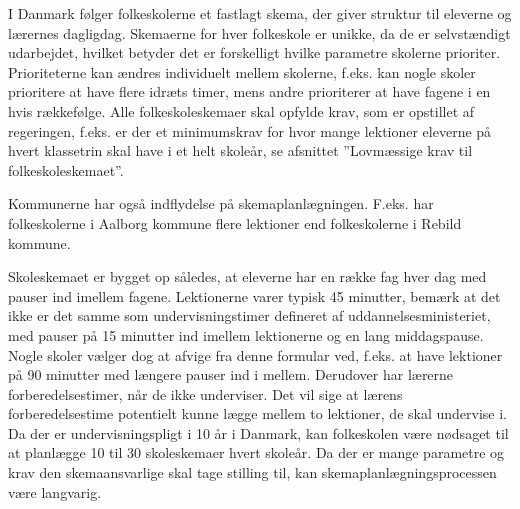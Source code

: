 I Danmark følger folkeskolerne et fastlagt skema, der giver struktur til eleverne og lærernes dagligdag. Skemaerne for hver folkeskole er unikke, da de er selvstændigt udarbejdet, hvilket betyder det er forskelligt hvilke parametre skolerne prioriter. Prioriteterne kan ændres individuelt mellem skolerne, f.eks. kan nogle skoler prioritere at have flere idræts timer, mens andre prioriterer at have fagene i en hvis rækkefølge. Alle folkeskoleskemaer skal opfylde krav, som er opstillet af regeringen, f.eks. er der et minimumskrav for hvor mange lektioner eleverne på hvert klassetrin skal have i et helt skoleår, se afsnittet ”Lovmæssige krav til folkeskoleskemaet”. 

Kommunerne har også indflydelse på skemaplanlægningen. F.eks. har folkeskolerne i Aalborg kommune flere lektioner end folkeskolerne i Rebild kommune. 

Skoleskemaet er bygget op således, at eleverne har en række fag hver dag med pauser ind imellem fagene. Lektionerne varer typisk 45 minutter, bemærk at det ikke er det samme som undervisningstimer defineret af uddannelsesministeriet, med pauser på 15 minutter ind imellem lektionerne og en lang middagspause. Nogle skoler vælger dog at afvige fra denne formular ved, f.eks. at have lektioner på 90 minutter med længere pauser ind i mellem. Derudover har lærerne forberedelsestimer, når de ikke underviser. Det vil sige at  lærens forberedelsestime potentielt kunne lægge mellem to lektioner, de skal undervise i. Da der er undervisningspligt i 10 år i Danmark, kan folkeskolen være nødsaget til at planlægge 10 til 30 skoleskemaer hvert skoleår. Da der er mange parametre og krav den skemaansvarlige skal tage stilling til, kan skemaplanlægningsprocessen være langvarig.